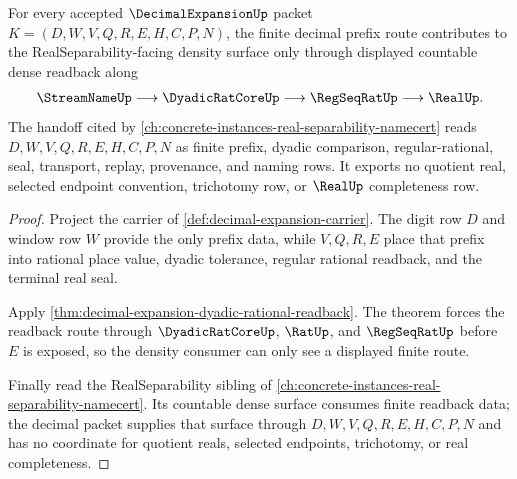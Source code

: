 \begin{theorem}\label{thm:decimal-expansion-real-separability-density-route}
For every accepted $\DecimalExpansionUp$ packet $K=(D,W,V,Q,R,E,H,C,P,N)$, the finite decimal prefix route contributes to the RealSeparability-facing density surface only through displayed countable dense readback along
$$
\begin{gathered}
\StreamNameUp \longrightarrow \DyadicRatCoreUp \longrightarrow \RegSeqRatUp \longrightarrow \RealUp.
\end{gathered}
$$
The handoff cited by \autoref{ch:concrete-instances-real-separability-namecert} reads $D,W,V,Q,R,E,H,C,P,N$ as finite prefix, dyadic comparison, regular-rational, seal, transport, replay, provenance, and naming rows. It exports no quotient real, selected endpoint convention, trichotomy row, or $\RealUp$ completeness row.
\end{theorem}
\begin{proof}
Project the carrier of \autoref{def:decimal-expansion-carrier}. The digit row $D$ and window row $W$ provide the only prefix data, while $V,Q,R,E$ place that prefix into rational place value, dyadic tolerance, regular rational readback, and the terminal real seal.

Apply \autoref{thm:decimal-expansion-dyadic-rational-readback}. The theorem forces the readback route through $\DyadicRatCoreUp$, $\RatUp$, and $\RegSeqRatUp$ before $E$ is exposed, so the density consumer can only see a displayed finite route.

Finally read the RealSeparability sibling of \autoref{ch:concrete-instances-real-separability-namecert}. Its countable dense surface consumes finite readback data; the decimal packet supplies that surface through $D,W,V,Q,R,E,H,C,P,N$ and has no coordinate for quotient reals, selected endpoints, trichotomy, or real completeness.
\end{proof}

